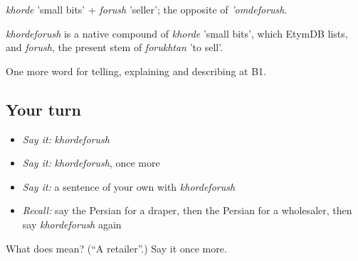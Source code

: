 \emph{khorde} 'small bits' + \emph{forush} 'seller'; the opposite of \emph{'omdeforush}.

\begin{cousinweb}
\emph{khordeforush} is a native compound of \emph{khorde} 'small bits', which EtymDB lists, and \emph{forush}, the present stem of \emph{forukhtan} 'to sell'.
\end{cousinweb}

\begin{grammarlens}[title={What you've built}]
One more word for telling, explaining and describing at B1.
\end{grammarlens}

\subsection*{Your turn}
\begin{itemize}
\raggedright
  \item \emph{Say it:} \emph{khordeforush}
  \item \emph{Say it:} \emph{khordeforush}, once more
  \item \emph{Say it:} a sentence of your own with \emph{khordeforush}
  \item \emph{Recall:} say the Persian for a draper, then the Persian for a wholesaler, then say \emph{khordeforush} again
\end{itemize}

\begin{tcolorbox}[breakable,colback=teal!4,colframe=teal!35!black,title={Before you move on}]
What does   mean? (\textquotedblleft{}A retailer\textquotedblright{}.) Say it once more.
\end{tcolorbox}
